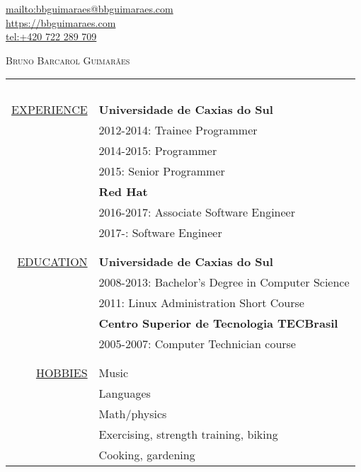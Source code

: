 \begin{flushright}
    \url{mailto:bbguimaraes@bbguimaraes.com} \\
    \url{https://bbguimaraes.com} \\
    \url{tel:+420 722 289 709}
\end{flushright}

\vspace{3\baselineskip}
{\Huge \textsc{Bruno Barcarol Guimarães}}
\bigskip

\begin{center}

\begin{tabular}{rl}
    \multicolumn{2}{c}{~\hspace{.95\textwidth}~} \\
    \hspace{5em}
    \hyperref[sec:professional]{\uppercase{Experience}}
    & \textbf{Universidade de Caxias do Sul} \\
    & 2012-2014: Trainee Programmer \\
    & 2014-2015: Programmer \\
    & 2015: Senior Programmer \\
    & \textbf{Red Hat} \\
    & 2016-2017: Associate Software Engineer \\
    & 2017-: Software Engineer
    \\\\ \hline \\
    \hyperref[sec:education]{\uppercase{Education}}
    & \textbf{Universidade de Caxias do Sul} \\
    & 2008-2013: Bachelor's Degree in Computer Science \\
    & 2011: Linux Administration Short Course \\
    & \textbf{Centro Superior de Tecnologia TECBrasil} \\
    & 2005-2007: Computer Technician course \\
    \\ \hline \\
    \hyperref[sec:etc]{\uppercase{Hobbies}}
    & Music \\
    & Languages \\
    & Math/physics \\
    & Exercising, strength training, biking \\
    & Cooking, gardening
\end{tabular}

\end{center}
